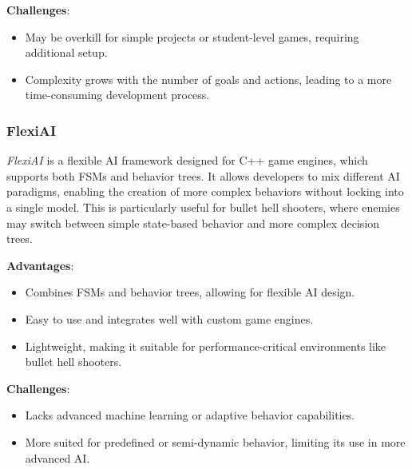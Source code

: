 \textbf{Challenges}:
\begin{itemize}
    \item May be overkill for simple projects or student-level games, requiring additional setup.
    \item Complexity grows with the number of goals and actions, leading to a more time-consuming development process.
\end{itemize}

\subsubsection{FlexiAI}

\textit{FlexiAI} is a flexible AI framework designed for C++ game engines, which supports both FSMs and behavior trees. It allows developers to mix different AI paradigms, enabling the creation of more complex behaviors without locking into a single model. This is particularly useful for bullet hell shooters, where enemies may switch between simple state-based behavior and more complex decision trees.

\textbf{Advantages}:
\begin{itemize}
    \item Combines FSMs and behavior trees, allowing for flexible AI design.
    \item Easy to use and integrates well with custom game engines.
    \item Lightweight, making it suitable for performance-critical environments like bullet hell shooters.
\end{itemize}

\textbf{Challenges}:
\begin{itemize}
    \item Lacks advanced machine learning or adaptive behavior capabilities.
    \item More suited for predefined or semi-dynamic behavior, limiting its use in more advanced AI.
\end{itemize}
